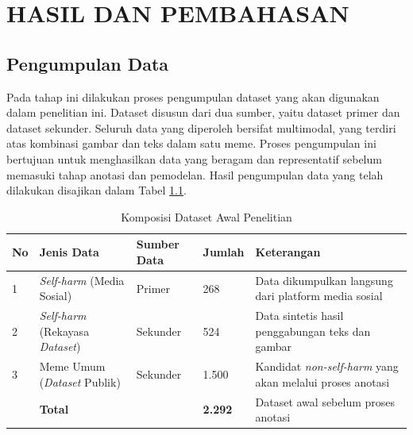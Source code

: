 \newpage
\chapter{HASIL DAN PEMBAHASAN} \label{Bab IV}

\section{Pengumpulan Data} \label{IV.PengumpulanData}
Pada tahap ini dilakukan proses pengumpulan dataset yang akan digunakan dalam penelitian ini. Dataset disusun dari dua sumber, yaitu dataset primer dan dataset sekunder. Seluruh data yang diperoleh bersifat multimodal, yang terdiri atas kombinasi gambar dan teks dalam satu meme. Proses pengumpulan ini bertujuan untuk menghasilkan data yang beragam dan representatif sebelum memasuki tahap anotasi dan pemodelan. Hasil pengumpulan data yang telah dilakukan disajikan dalam Tabel \ref{table:4.data_collection}.

\begin{table}[H]
    \centering
    \caption{Komposisi Dataset Awal Penelitian}
    \label{table:4.data_collection}
    \small
    \setlength{\tabcolsep}{3pt}
    \renewcommand{\arraystretch}{1.1}
    \begin{tabular}{p{0.6cm} p{3.8cm} p{1.6cm} p{1.4cm} p{5.6cm}}
        \hline
        \textbf{No} & {\raggedright \textbf{Jenis Data}\par} & \textbf{Sumber Data} & \textbf{Jumlah} & \textbf{Keterangan} \\
        \hline
        1 & {\raggedright \textit{Self-harm} (Media Sosial)\par} & Primer & 268 & Data dikumpulkan langsung dari platform media sosial \\
        2 & {\raggedright \textit{Self-harm} (Rekayasa \textit{Dataset})\par} & Sekunder & 524 & Data sintetis hasil penggabungan teks dan gambar \\
        3 & {\raggedright Meme Umum (\textit{Dataset} Publik)\par} & Sekunder & 1.500 & Kandidat \textit{non-self-harm} yang akan melalui proses anotasi \\
        \hline
        & {\raggedright \textbf{Total}\par} & & \textbf{2.292} & Dataset awal sebelum proses anotasi \\
        \hline
    \end{tabular}
\end{table}

